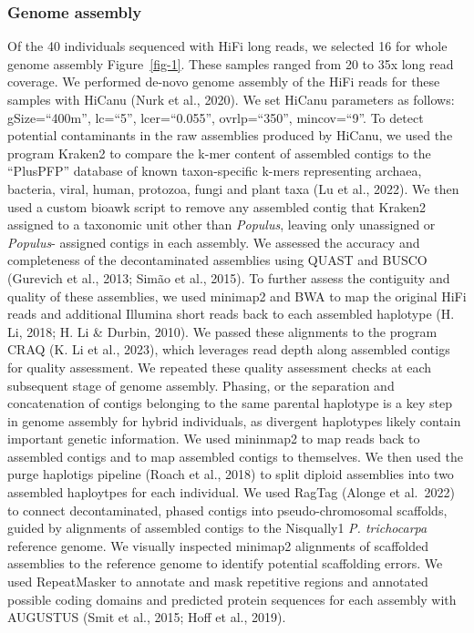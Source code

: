 \documentclass[
]{agujournal2019}
\begin{document}
\subsubsection{Genome assembly}\label{genome-assembly}

Of the 40 individuals sequenced with HiFi long reads, we selected 16 for
whole genome assembly Figure~\ref{fig-1}. These samples ranged from 20
to 35x long read coverage. We performed de-novo genome assembly of the
HiFi reads for these samples with HiCanu (Nurk et al., 2020). We set
HiCanu parameters as follows: gSize=``400m'', lc=``5'', lcer=``0.055'',
ovrlp=``350'', mincov=``9''. To detect potential contaminants in the raw
assemblies produced by HiCanu, we used the program Kraken2 to compare
the k-mer content of assembled contigs to the ``PlusPFP'' database of
known taxon-specific k-mers representing archaea, bacteria, viral,
human, protozoa, fungi and plant taxa (Lu et al., 2022). We then used a
custom bioawk script to remove any assembled contig that Kraken2
assigned to a taxonomic unit other than \emph{Populus}, leaving only
unassigned or \emph{Populus}- assigned contigs in each assembly. We
assessed the accuracy and completeness of the decontaminated assemblies
using QUAST and BUSCO (Gurevich et al., 2013; Simão et al., 2015). To
further assess the contiguity and quality of these assemblies, we used
minimap2 and BWA to map the original HiFi reads and additional Illumina
short reads back to each assembled haplotype (H. Li, 2018; H. Li \&
Durbin, 2010). We passed these alignments to the program CRAQ (K. Li et
al., 2023), which leverages read depth along assembled contigs for
quality assessment. We repeated these quality assessment checks at each
subsequent stage of genome assembly. Phasing, or the separation and
concatenation of contigs belonging to the same parental haplotype is a
key step in genome assembly for hybrid individuals, as divergent
haplotypes likely contain important genetic information. We used
mininmap2 to map reads back to assembled contigs and to map assembled
contigs to themselves. We then used the purge haplotigs pipeline (Roach
et al., 2018) to split diploid assemblies into two assembled haploytpes
for each individual. We used RagTag (Alonge et al.~2022) to connect
decontaminated, phased contigs into pseudo-chromosomal scaffolds, guided
by alignments of assembled contigs to the Nisqually1 \emph{P.
trichocarpa} reference genome. We visually inspected minimap2 alignments
of scaffolded assemblies to the reference genome to identify potential
scaffolding errors. We used RepeatMasker to annotate and mask repetitive
regions and annotated possible coding domains and predicted protein
sequences for each assembly with AUGUSTUS (Smit et al., 2015; Hoff et
al., 2019).
\end{document}
